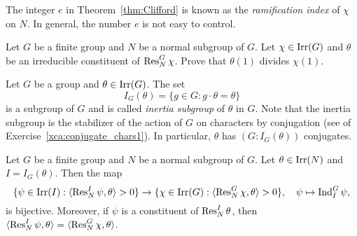 The integer $e$ in Theorem~\ref{thm:Clifford} is known as the \emph{ramification index} of $\chi$ on $N$. In general, the number $e$ is not easy to control. 

\begin{exercise}
\label{xca:Clifford_divisibility}
    Let $G$ be a finite group and $N$ be a normal subgroup of $G$. Let $\chi\in\operatorname{Irr}(G)$ and $\theta$ 
    be an irreducible constituent of $\operatorname{Res}_N^G\chi$. 
    Prove that $\theta(1)$ divides $\chi(1)$. 
\end{exercise}

Let $G$ be a group and $\theta\in\operatorname{Irr}(G)$. The set 
\[
I_G(\theta)=\{g\in G:g\cdot\theta=\theta\}
\]
is a subgroup of $G$ and is called \emph{inertia subgroup} of $\theta$ in $G$. Note that the inertia
subgroup is the stabilizer of the action of $G$ 
on characters by conjugation (see 
of Exercise~\ref{xca:conjugate_chars1}). In particular, 
$\theta$ has 
$(G:I_G(\theta))$ conjugates. 

\begin{theorem}
\label{thm:Clifford_correspondence}
    Let $G$ be a finite group and $N$ be a normal subgroup of $G$. Let $\theta\in\operatorname{Irr}(N)$ and $I=I_G(\theta)$.  Then 
    the map 
    \[
    \{\psi\in\operatorname{Irr}(I):\langle\operatorname{Res}_N^I\psi,\theta\rangle>0\}\to 
    \{\chi\in\operatorname{Irr}(G):\langle\operatorname{Res}_N^G\chi,\theta\rangle>0\},\quad 
    \psi\mapsto\operatorname{Ind}_I^G\psi,
    \]
    is bijective. Moreover, if $\psi$ is a constituent of $\operatorname{Res}_N^I\theta$, then 
    $\langle\operatorname{Res}_N^I\psi,\theta\rangle=\langle\operatorname{Res}_N^G\chi,\theta\rangle$. 
\end{theorem}

